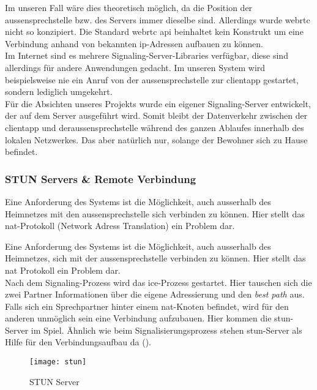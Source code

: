 Im unseren Fall wäre dies theoretisch möglich, da die Position der \gls{aussensprechstelle} bzw. des Servers immer dieselbe sind. Allerdings wurde \gls{webrtc} nicht so konzipiert. Die Standard \gls{webrtc} \gls{api} beinhaltet kein Konstrukt um eine Verbindung anhand von bekannten \gls{ip}-Adressen aufbauen zu können.
\\
Im Internet sind es mehrere Signaling-Server-Libraries verfügbar, diese sind allerdings für andere Anwendungen gedacht. Im unseren System wird beispielsweise nie ein Anruf von der \gls{aussensprechstelle} zur \gls{clientapp} gestartet, sondern lediglich umgekehrt.
\\
Für die Absichten unseres Projekts wurde ein eigener Signaling-Server entwickelt, der auf dem Server ausgeführt wird. Somit bleibt der Datenverkehr zwischen der \gls{clientapp} und der\gls{aussensprechstelle} während des ganzen Ablaufes innerhalb des lokalen Netzwerkes. Das aber natürlich nur, solange der Bewohner sich zu Hause befindet.

\subsubsection{STUN Servers \& Remote Verbindung}
\label{test}
Eine Anforderung des Systems ist die Möglichkeit, auch ausserhalb des Heimnetzes mit den \gls{aussensprechstelle} sich verbinden zu können. Hier stellt das \gls{nat}-Protokoll (Network Adress Translation) ein Problem dar.

Eine Anforderung des Systems ist die Möglichkeit, auch ausserhalb des Heimnetzes, sich mit der \gls{aussensprechstelle} verbinden zu können. Hier stellt das \gls{nat} Protokoll ein Problem dar.
\\
Nach dem Signaling-Prozess wird das \gls{ice}-Prozess gestartet. Hier tauschen sich die zwei Partner Informationen über die eigene Adressierung und den \textit{best path} aus. Falls sich ein Sprechpartner hinter einem \gls{nat}-Knoten befindet, wird für den anderen unmöglich sein eine Verbindung aufzubauen. Hier kommen die \gls{stun}-Server im Spiel. 
Ähnlich wie beim Signalisierungsprozess stehen \gls{stun}-Server als Hilfe für den Verbindungsaufbau da ().

\begin{figure}[htb!]
	\begin{center}
		\texttt{[image: stun]}
		\caption[STUN Server]{STUN Server}
		\label{fig:stun}
	\end{center}
\end{figure}

